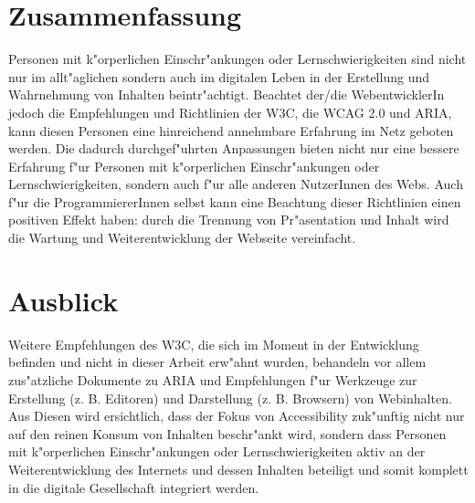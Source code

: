\documentclass[a4paper,bibtotoc,oneside]{scrbook}
\begin{document}
\chapter{Zusammenfassung}
Personen mit k"orperlichen Einschr"ankungen oder Lernschwierigkeiten sind nicht nur im allt"aglichen sondern auch im digitalen Leben in der Erstellung und Wahrnehmung von Inhalten beintr"achtigt. Beachtet der/die WebentwicklerIn jedoch die Empfehlungen und Richtlinien der W3C, die WCAG 2.0 und ARIA, kann diesen Personen eine hinreichend annehmbare Erfahrung im Netz geboten werden. Die dadurch durchgef"uhrten Anpassungen bieten nicht nur eine bessere Erfahrung f"ur Personen mit k"orperlichen Einschr"ankungen oder Lernschwierigkeiten, sondern auch f"ur alle anderen NutzerInnen des Webs. Auch f"ur die ProgrammiererInnen selbst kann eine Beachtung dieser Richtlinien einen positiven Effekt haben: durch die Trennung von Pr"asentation und Inhalt wird die Wartung und Weiterentwicklung der Webseite vereinfacht. 

\chapter{Ausblick}
Weitere Empfehlungen des W3C, die sich im Moment in der Entwicklung befinden und nicht in dieser Arbeit erw"ahnt wurden, behandeln vor allem zus"atzliche Dokumente zu ARIA und Empfehlungen f"ur Werkzeuge zur Erstellung (z. B. Editoren) und Darstellung (z. B. Browsern) von Webinhalten. Aus Diesen wird ersichtlich, dass der Fokus von Accessibility zuk"unftig nicht nur auf den reinen Konsum von Inhalten beschr"ankt wird, sondern dass Personen mit k"orperlichen Einschr"ankungen oder Lernschwierigkeiten aktiv an der Weiterentwicklung des Internets und dessen Inhalten beteiligt und somit komplett in die digitale Gesellschaft integriert werden. \cite{acc_all}







\end{document}
